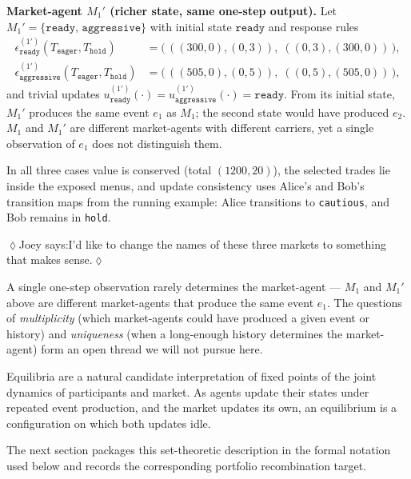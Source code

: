 \documentclass[11pt, one side, article]{memoir}
\theoremstyle{definition}
\theoremstyle{plain}
\newenvironment{example}
  {\pushQED{\qed}\renewcommand{\qedsymbol}{$\lozenge$}\examplex}
  {\popQED\endexamplex}
\newcommand{\0}{\textsf{0}}
\newcommand{\1}{\tn{\textsf{1}}}
\newcommand{\jnote}[1]{{\color{teal}\quad$\lozenge$\quad Joey says:\quad #1\quad$\lozenge$\quad}}
\begin{document}
\begin{example}
\medskip
\noindent\textbf{Market-agent $M_1'$ (richer state, same one-step output).}  Let $M_1' = \{\texttt{ready},\,\texttt{aggressive}\}$ with initial state $\texttt{ready}$ and response rules
\begin{align*}
\epsilon^{(1')}_{\texttt{ready}}(T_{\texttt{eager}}, T_{\texttt{hold}})
&=\big(\,((300,0),(0,3)),\;((0,3),(300,0))\,\big),\\
\epsilon^{(1')}_{\texttt{aggressive}}(T_{\texttt{eager}}, T_{\texttt{hold}})
&=\big(\,((505,0),(0,5)),\;((0,5),(505,0))\,\big),
\end{align*}
and trivial updates $u^{(1')}_{\texttt{ready}}(\cdot) = u^{(1')}_{\texttt{aggressive}}(\cdot) = \texttt{ready}$.  From its initial state, $M_1'$ produces the same event $e_1$ as $M_1$; the second state would have produced $e_2$.  $M_1$ and $M_1'$ are different market-agents with different carriers, yet a single observation of $e_1$ does not distinguish them.

\medskip
In all three cases value is conserved (total $(1200, 20)$), the selected trades lie inside the exposed menus, and update consistency uses Alice's and Bob's transition maps from the running example: Alice transitions to \texttt{cautious}, and Bob remains in \texttt{hold}.  %
\end{example}

\jnote{I'd like to change the names of these three markets to something that makes sense.}

A single one-step observation rarely determines the market-agent --- $M_1$ and $M_1'$ above are different market-agents that produce the same event $e_1$.  The questions of \emph{multiplicity} (which market-agents could have produced a given event or history) and \emph{uniqueness} (when a long-enough history determines the market-agent) form an open thread we will not pursue here.

Equilibria are a natural candidate interpretation of fixed points of the joint dynamics of participants and market.  As agents update their states under repeated event production, and the market updates its own, an equilibrium is a configuration on which both updates idle.

The next section packages this set-theoretic description in the formal notation used below and records the corresponding portfolio recombination target.
\end{document}
